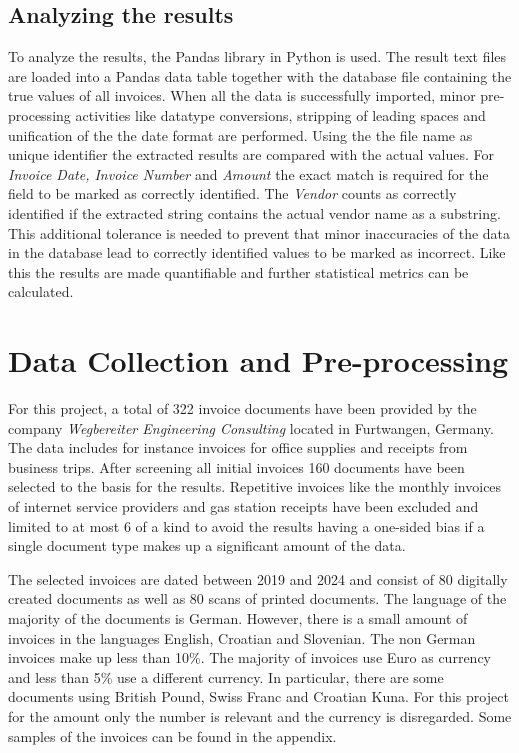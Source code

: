 \subsection{Analyzing the results}
To analyze the results, the Pandas library in Python is used. The result text files are loaded into a Pandas data table together with the database file
containing the true values of all invoices. When all the data is successfully imported, minor pre-processing activities like datatype conversions, stripping of leading spaces and unification of the the date format are performed.
Using the the file name as unique identifier the extracted results are compared with the actual values. For \textit{Invoice Date, Invoice Number}
and \textit{Amount} the exact match is required for the field to be marked as correctly identified. 
The \textit{Vendor} counts as correctly identified if the extracted string contains the actual vendor name as a substring. This additional tolerance is needed to prevent that minor inaccuracies of the data in the database lead to correctly identified values to be marked as incorrect.
Like this the results are made quantifiable and further statistical metrics can be calculated.

\newpage
\section{Data Collection and Pre-processing}
For this project, a total of 322 invoice documents have been provided by the company \textit{Wegbereiter Engineering Consulting} located in Furtwangen, Germany. The data includes for instance invoices for office supplies and receipts from business trips. After screening all initial invoices 160 documents have been selected to the basis for the results. Repetitive invoices like the monthly invoices of internet service providers and gas station receipts have been excluded and limited to at most 6 of a kind to avoid the results having a one-sided bias if a single document type makes up a significant amount of the data.

The selected invoices are dated between 2019 and 2024 and consist of 80 digitally created documents as well as 80 scans of printed documents. 
The language of the majority of the documents is German. However, there is a small amount of invoices in the languages English, Croatian and Slovenian. The non German invoices make up less than 10\%.
The majority of invoices use Euro as currency and less than 5\% use a different currency. In particular, there are some documents using British Pound, Swiss Franc and Croatian Kuna. For this project for the amount only the number is relevant and the currency is disregarded.
Some samples of the invoices can be found in the appendix.

